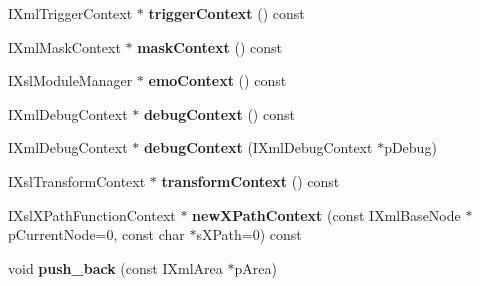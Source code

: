 \begin{DoxyCompactItemize}
\item 
\hypertarget{classgeneral__server_1_1XmlAdminQueryEnvironment_a7b5c1e7cd029fb8d3d2814fbbe6addd0}{\-I\-Xml\-Trigger\-Context $\ast$ {\bfseries trigger\-Context} () const }\label{classgeneral__server_1_1XmlAdminQueryEnvironment_a7b5c1e7cd029fb8d3d2814fbbe6addd0}

\item 
\hypertarget{classgeneral__server_1_1XmlAdminQueryEnvironment_aa4c9901b4ad298133c63872c97e1dd5c}{\-I\-Xml\-Mask\-Context $\ast$ {\bfseries mask\-Context} () const }\label{classgeneral__server_1_1XmlAdminQueryEnvironment_aa4c9901b4ad298133c63872c97e1dd5c}

\item 
\hypertarget{classgeneral__server_1_1XmlAdminQueryEnvironment_a270b5627e97a91ec5bb42699a29164ca}{\-I\-Xsl\-Module\-Manager $\ast$ {\bfseries emo\-Context} () const }\label{classgeneral__server_1_1XmlAdminQueryEnvironment_a270b5627e97a91ec5bb42699a29164ca}

\item 
\hypertarget{classgeneral__server_1_1XmlAdminQueryEnvironment_a1baa2d445b935acdc22c9bc98081f6df}{\-I\-Xml\-Debug\-Context $\ast$ {\bfseries debug\-Context} () const }\label{classgeneral__server_1_1XmlAdminQueryEnvironment_a1baa2d445b935acdc22c9bc98081f6df}

\item 
\hypertarget{classgeneral__server_1_1XmlAdminQueryEnvironment_a2cf2be25c22a0e9681ebb17f6335ec22}{\-I\-Xml\-Debug\-Context $\ast$ {\bfseries debug\-Context} (\-I\-Xml\-Debug\-Context $\ast$p\-Debug)}\label{classgeneral__server_1_1XmlAdminQueryEnvironment_a2cf2be25c22a0e9681ebb17f6335ec22}

\item 
\hypertarget{classgeneral__server_1_1XmlAdminQueryEnvironment_a3fb45d6b7ed268cfa74e02890c5c5317}{\-I\-Xsl\-Transform\-Context $\ast$ {\bfseries transform\-Context} () const }\label{classgeneral__server_1_1XmlAdminQueryEnvironment_a3fb45d6b7ed268cfa74e02890c5c5317}

\item 
\hypertarget{classgeneral__server_1_1XmlAdminQueryEnvironment_a42b057e63b556ab8a16e3338b3ef8f03}{\-I\-Xsl\-X\-Path\-Function\-Context $\ast$ {\bfseries new\-X\-Path\-Context} (const \-I\-Xml\-Base\-Node $\ast$p\-Current\-Node=0, const char $\ast$s\-X\-Path=0) const }\label{classgeneral__server_1_1XmlAdminQueryEnvironment_a42b057e63b556ab8a16e3338b3ef8f03}

\item 
\hypertarget{classgeneral__server_1_1XmlAdminQueryEnvironment_aa46c5a8705c6c6bd5d0bc2037312c8d5}{void {\bfseries push\-\_\-back} (const \-I\-Xml\-Area $\ast$p\-Area)}\label{classgeneral__server_1_1XmlAdminQueryEnvironment_aa46c5a8705c6c6bd5d0bc2037312c8d5}


\end{DoxyCompactItemize}
